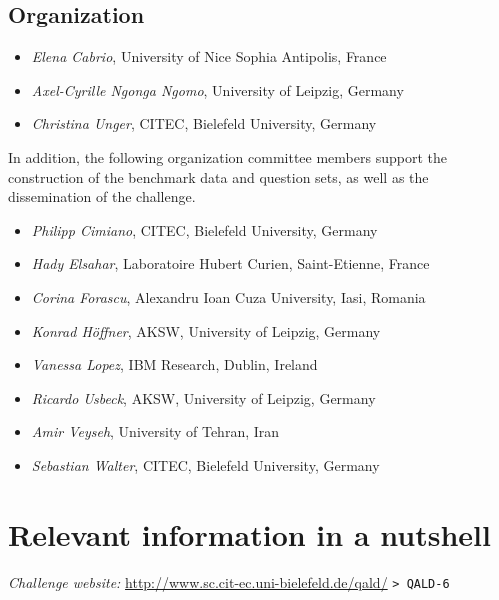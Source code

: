 \documentclass[a4paper]{article}
\begin{document}
{\subsection*{Organization}

\begin{itemize}
\item {\em Elena Cabrio}, University of Nice Sophia Antipolis, France
\item {\em Axel-Cyrille Ngonga Ngomo}, University of Leipzig, Germany
\item {\em Christina Unger}, CITEC, Bielefeld University, Germany
\end{itemize}

In addition, the following organization committee members support the construction of the benchmark data and question sets, as well as the dissemination of the challenge.

\begin{itemize}
\item {\em Philipp Cimiano}, CITEC, Bielefeld University, Germany
\item {\em Hady Elsahar}, Laboratoire Hubert Curien, Saint-Etienne, France
\item {\em Corina Forascu}, Alexandru Ioan Cuza University, Iasi, Romania
\item {\em Konrad H\"offner}, AKSW, University of Leipzig, Germany
\item {\em Vanessa Lopez}, IBM Research, Dublin, Ireland
\item {\em Ricardo Usbeck}, AKSW, University of Leipzig, Germany
\item {\em Amir Veyseh}, University of Tehran, Iran
\item {\em Sebastian Walter}, CITEC, Bielefeld University, Germany
\end{itemize}

%

\newpage

\section{Relevant information in a nutshell}

{\em Challenge website:} \url{http://www.sc.cit-ec.uni-bielefeld.de/qald/} \texttt{> QALD-6}

}
\end{document}

